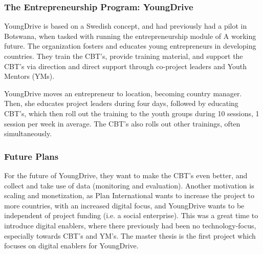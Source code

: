 \subsubsection{The Entrepreneurship Program: YoungDrive}

YoungDrive is based on a Swedish concept, and had previously had a pilot in Botswana, when tasked with running the entrepreneurship module of A working future. The organization fosters and educates young entrepreneurs in developing countries. They train the CBT's, provide training material, and support the CBT's via direction and direct support through co-project leaders and Youth Mentors (YMs).

YoungDrive moves an entrepreneur to location, becoming country manager. Then, she educates project leaders during four days, followed by educating CBT's, which then roll out the training to the youth groups during 10 sessions, 1 session per week in average. The CBT's also rolls out other trainings, often simultaneously.

\subsubsection{Future Plans}

For the future of YoungDrive, they want to make the CBT's even better, and collect and take use of data (monitoring and evaluation). Another motivation is scaling and monetization, as Plan International wants to increase the project to more countries, with an increased digital focus, and YoungDrive wants to be independent of project funding (i.e. a social enterprise). This was a great time to introduce digital enablers, where there previously had been no technology-focus, especially towards CBT's and YM's. The master thesis is the first project which focuses on digital enablers for YoungDrive.
